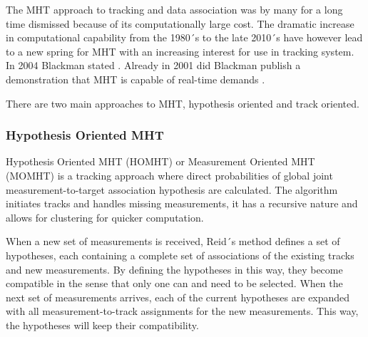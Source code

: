 The MHT approach to tracking and data association was by many for a long time dismissed because of its computationally large cost. The dramatic increase in computational capability from the 1980´s to the late 2010´s have however lead to a new spring for MHT with an increasing interest for use in tracking system. In 2004 Blackman stated \cite{Blackman2004}. Already in 2001 did Blackman publish a demonstration that MHT is capable of real-time demands \cite{Blackman2001}.

There are two main approaches to MHT, hypothesis oriented and track oriented.

\subsubsection{Hypothesis Oriented MHT}
Hypothesis Oriented MHT (HOMHT) or Measurement Oriented MHT (MOMHT) is a tracking approach where direct probabilities of global joint measurement-to-target association hypothesis are calculated. The algorithm initiates tracks and handles missing measurements, it has a recursive nature and allows for clustering for quicker computation.

When a new set of measurements is received, Reid´s method defines a set of hypotheses, each containing a complete set of associations of the existing tracks and new measurements. By defining the hypotheses in this way, they become compatible in the sense that only one can and need to be selected. When the next set of measurements arrives, each of the current hypotheses are expanded with all measurement-to-track assignments for the new measurements. This way, the hypotheses will keep their compatibility.

